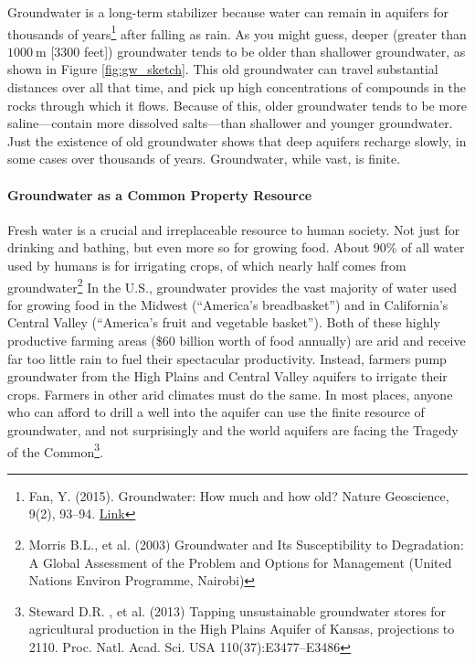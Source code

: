 \documentclass[amstex,12pt]{book}
\begin{document}
Groundwater is a long-term stabilizer because water can remain in aquifers for thousands of years\footnote{Fan, Y. (2015). Groundwater: How much and how old? Nature Geoscience, 9(2), 93–94. \href{https://doi.org/10.1038/ngeo2609}{Link}} after falling as rain. As you might guess, deeper (greater than $\SI{1000}{\metre}$ [3300 feet]) groundwater tends to be older than shallower groundwater, as shown in Figure \ref{fig:gw_sketch}. This old groundwater can travel substantial distances over all that time, and pick up high concentrations of compounds in the rocks through which it flows. Because of this, older groundwater tends to be more saline---contain more dissolved salts---than shallower and younger groundwater. Just the existence of old groundwater shows that deep aquifers recharge slowly, in some cases over thousands of years. Groundwater, while vast, is finite. 

\paragraph{Groundwater as a Common Property Resource}
Fresh water is a crucial and irreplaceable resource to human society. Not just for drinking and bathing, but even more so for growing food. About 90\% of all water used by humans is for irrigating crops, of which nearly half comes from groundwater\footnote{Morris B.L., et al. (2003) Groundwater and Its Susceptibility to Degradation: A Global Assessment of the Problem and Options for Management (United Nations Environ Programme, Nairobi)} In the U.S., groundwater provides the vast majority of water used for growing food in the Midwest (``America's breadbasket'') and in California's Central Valley (``America's fruit and vegetable basket''). Both of these highly productive farming areas (\$60 billion worth of food annually) are arid and receive far too little rain to fuel their spectacular productivity. Instead, farmers pump groundwater from the High Plains and Central Valley aquifers to irrigate their crops. Farmers in other arid climates must do the same. In most places, anyone who can afford to drill a well into the aquifer can use the finite resource of groundwater, and not surprisingly and the world aquifers are facing the Tragedy of the Common\footnote{Steward D.R. , et al. (2013) Tapping unsustainable groundwater stores for agricultural production in the High Plains Aquifer of Kansas, projections to 2110. Proc. Natl. Acad. Sci. USA 110(37):E3477–E3486}. 
\end{document}
